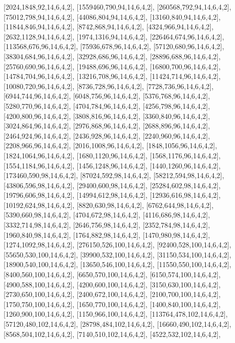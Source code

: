 \documentclass[12pt]{amsart}
\begin{document}
[2024,1848,92,14,6,4,2],   [1559460,790,94,14,6,4,2],   [260568,792,94,14,6,4,2],   [75012,798,94,14,6,4,2],   [44086,804,94,14,6,4,2],   [13160,840,94,14,6,4,2],
[11844,846,94,14,6,4,2],   [8742,868,94,14,6,4,2],   [4324,966,94,14,6,4,2],   [2632,1128,94,14,6,4,2],   [1974,1316,94,14,6,4,2],   [226464,674,96,14,6,4,2],
[113568,676,96,14,6,4,2],   [75936,678,96,14,6,4,2],   [57120,680,96,14,6,4,2],   [38304,684,96,14,6,4,2],   [32928,686,96,14,6,4,2],   [28896,688,96,14,6,4,2],
[25760,690,96,14,6,4,2],   [19488,696,96,14,6,4,2],   [16800,700,96,14,6,4,2],   [14784,704,96,14,6,4,2],   [13216,708,96,14,6,4,2],   [11424,714,96,14,6,4,2],
[10080,720,96,14,6,4,2],   [8736,728,96,14,6,4,2],   [7728,736,96,14,6,4,2],   [6944,744,96,14,6,4,2],   [6048,756,96,14,6,4,2],   [5376,768,96,14,6,4,2],
[5280,770,96,14,6,4,2],   [4704,784,96,14,6,4,2],   [4256,798,96,14,6,4,2],   [4200,800,96,14,6,4,2],   [3808,816,96,14,6,4,2],   [3360,840,96,14,6,4,2],
[3024,864,96,14,6,4,2],   [2976,868,96,14,6,4,2],   [2688,896,96,14,6,4,2],   [2464,924,96,14,6,4,2],   [2436,928,96,14,6,4,2],   [2240,960,96,14,6,4,2],
[2208,966,96,14,6,4,2],   [2016,1008,96,14,6,4,2],   [1848,1056,96,14,6,4,2],   [1824,1064,96,14,6,4,2],   [1680,1120,96,14,6,4,2],   [1568,1176,96,14,6,4,2],
[1554,1184,96,14,6,4,2],   [1456,1248,96,14,6,4,2],   [1440,1260,96,14,6,4,2],   [173460,590,98,14,6,4,2],   [87024,592,98,14,6,4,2],   [58212,594,98,14,6,4,2],
[43806,596,98,14,6,4,2],   [29400,600,98,14,6,4,2],   [25284,602,98,14,6,4,2],   [19796,606,98,14,6,4,2],   [14994,612,98,14,6,4,2],   [12936,616,98,14,6,4,2],
[10192,624,98,14,6,4,2],   [8820,630,98,14,6,4,2],   [6762,644,98,14,6,4,2],   [5390,660,98,14,6,4,2],   [4704,672,98,14,6,4,2],   [4116,686,98,14,6,4,2],
[3332,714,98,14,6,4,2],   [2646,756,98,14,6,4,2],   [2352,784,98,14,6,4,2],   [1960,840,98,14,6,4,2],   [1764,882,98,14,6,4,2],   [1470,980,98,14,6,4,2],
[1274,1092,98,14,6,4,2],   [276150,526,100,14,6,4,2],   [92400,528,100,14,6,4,2],   [55650,530,100,14,6,4,2],   [39900,532,100,14,6,4,2],   [31150,534,100,14,6,4,2],
[18900,540,100,14,6,4,2],   [13650,546,100,14,6,4,2],   [11550,550,100,14,6,4,2],   [8400,560,100,14,6,4,2],   [6650,570,100,14,6,4,2],   [6150,574,100,14,6,4,2],
[4900,588,100,14,6,4,2],   [4200,600,100,14,6,4,2],   [3150,630,100,14,6,4,2],   [2730,650,100,14,6,4,2],   [2400,672,100,14,6,4,2],   [2100,700,100,14,6,4,2],
[1750,750,100,14,6,4,2],   [1650,770,100,14,6,4,2],   [1400,840,100,14,6,4,2],   [1260,900,100,14,6,4,2],   [1150,966,100,14,6,4,2],   [113764,478,102,14,6,4,2],
[57120,480,102,14,6,4,2],   [28798,484,102,14,6,4,2],   [16660,490,102,14,6,4,2],   [8568,504,102,14,6,4,2],   [7140,510,102,14,6,4,2],   [4522,532,102,14,6,4,2],
\end{document}
